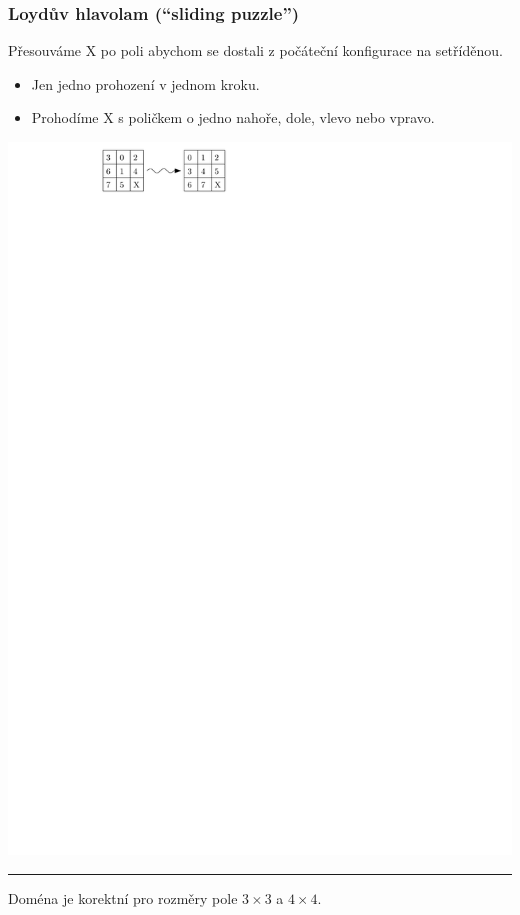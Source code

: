 \documentclass[usenames,dvipsnames,9pt]{beamer}
\begin{document}
\begin{frame}
  \frametitle{Loydův hlavolam (``sliding puzzle'')}
  
  Přesouváme X po poli abychom se dostali z počáteční konfigurace na setříděnou.
  
  \begin{itemize}
  \item Jen jedno prohození v jednom kroku.
  \item Prohodíme X s poličkem o jedno nahoře, dole, vlevo nebo vpravo.
  \end{itemize}
  
  \vspace{1em}

\begin{center}
\includegraphics[width=0.5\linewidth]{08/figs/sp.pdf}
\end{center}

\vspace{1em}\hrule\vspace{1em}

\faWarning\hspace{3pt} Doména je korektní pro rozměry pole $3\times 3$ a $4\times 4$.

\end{frame}
\end{document}
